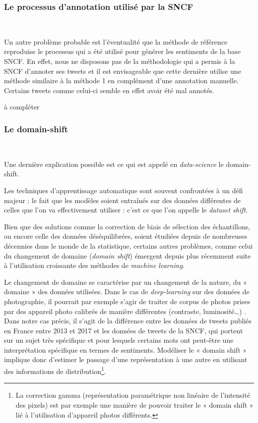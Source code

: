 \documentclass[11pt,french,french]{article}
\let\rmarkdownfootnote\footnote%
\def\footnote{\protect\rmarkdownfootnote}
\begin{document}
\subsubsection{Le processus d'annotation utilisé par la
SNCF}\label{le-processus-dannotation-utilisuxe9-par-la-sncf}

~

Un autre problème probable est l'éventualité que la méthode de référence
reproduise le processus qui a été utilisé pour générer les sentiments de
la base SNCF. En effet, nous ne disposons pas de la méthodologie qui a
permis à la SNCF d'annoter ses tweets et il est envisageable que cette
dernière utilise une méthode similaire à la méthode 1 en complément
d'une annotation manuelle. Certains tweets comme celui-ci semble en
effet avoir été mal annotés.

\colorbox{BurntOrange}{à compléter}

\subsubsection{Le domain-shift}\label{le-domain-shift}

~

Une dernière explication possible est ce qui est appelé en
\emph{data-science} le domain-shift.

Les techniques d'apprentissage automatique sont souvent confrontées à un
défi majeur : le fait que les modèles soient entraînés sur des données
différentes de celles que l'on va effectivement utiliser : c'est ce que
l'on appelle le \emph{dataset shift}.

Bien que des solutions comme la correction de biais de sélection des
échantillons, ou encore celle des données déséquilibrées, soient
étudiées depuis de nombreuses décennies dans le monde de la statistique,
certains autres problèmes, comme celui du changement de domaine
(\emph{domain shift}) émergent depuis plus récemment suite à
l'utilisation croissante des méthodes de \emph{machine learning}.

Le changement de domaine se caractérise par un changement de la nature,
du « domaine » des données utilisées. Dans le cas de
\emph{deep-learning} sur des données de photographie, il pourrait par
exemple s'agir de traiter de corpus de photos prises par des appareil
photo calibrés de manière différentes (contraste, luminosité\ldots{}) .
Dans notre cas précis, il s'agit de la différence entre les données de
tweets publiés en France entre 2013 et 2017 et les données de tweets de
la SNCF, qui portent sur un sujet très spécifique et pour lesquels
certains mots ont peut-être une interprétation spécifique en termes de
sentiments. Modéliser le « domain shift » implique donc d'estimer le
passage d'une représentation à une autre en utilisant des informations
de
distribution\footnote{La correction gamma (représentation paramétrique non linéaire de l’intensité des pixels) est par exemple une manière de pouvoir traiter le « domain shift » lié à l’utilisation d’appareil photos différents.}.
\end{document}
